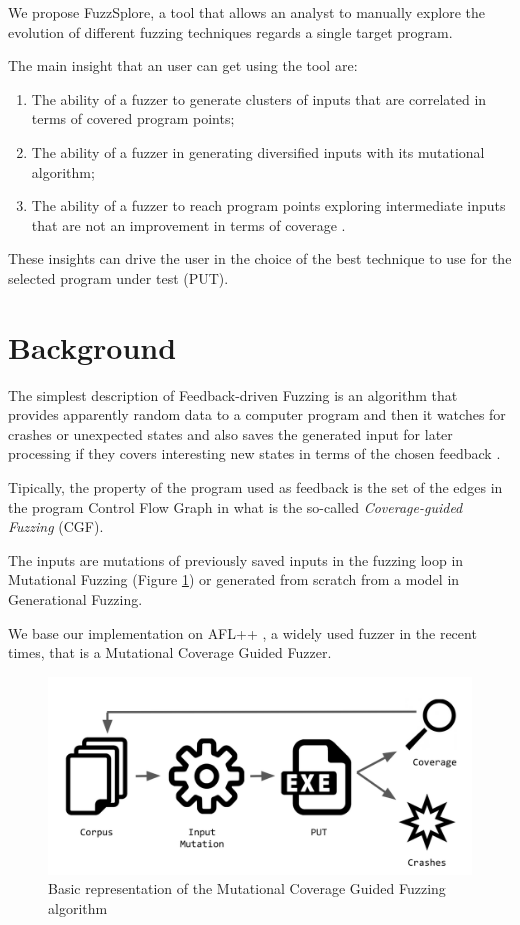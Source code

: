 \documentclass[conference,compsoc]{IEEEtran}
\begin{document}
We propose {\sc FuzzSplore}, a tool that allows an analyst to manually explore the evolution of different fuzzing techniques regards a single target program.

The main insight that an user can get using the tool are:

\begin{enumerate}
\item The ability of a fuzzer to generate clusters of inputs that are correlated in terms of covered program points;
\item The ability of a fuzzer in generating diversified inputs with its mutational algorithm;
\item The ability of a fuzzer to reach program points exploring intermediate inputs that are not an improvement in terms of coverage \cite{besensitive}.
\end{enumerate}

These insights can drive the user in the choice of the best technique to use for the selected program under test (PUT).

\section{Background}

The simplest description of Feedback-driven Fuzzing is an algorithm that provides apparently random data to a computer program and then it watches for crashes or unexpected states and also saves the generated input for later processing if they covers interesting new states in terms of the chosen feedback \cite{fuzzing-book}.

Tipically, the property of the program used as feedback is the set of the edges in the program Control Flow Graph \cite{compilerbook} in what is the so-called {\it Coverage-guided Fuzzing} (CGF).

The inputs are mutations of previously saved inputs in the fuzzing loop in Mutational Fuzzing (Figure \ref{fig:cfg}) or generated from scratch from a model in Generational Fuzzing.

We base our implementation on {\sc AFL++} \cite{aflplusplus}, a widely used fuzzer in the recent times, that is a Mutational Coverage Guided Fuzzer.

\begin{figure}[H]
\includegraphics[scale=0.2]{img/cgf}
\centering
\caption{Basic representation of the Mutational Coverage Guided Fuzzing algorithm}
\label{fig:cfg}
\end{figure}
\end{document}
